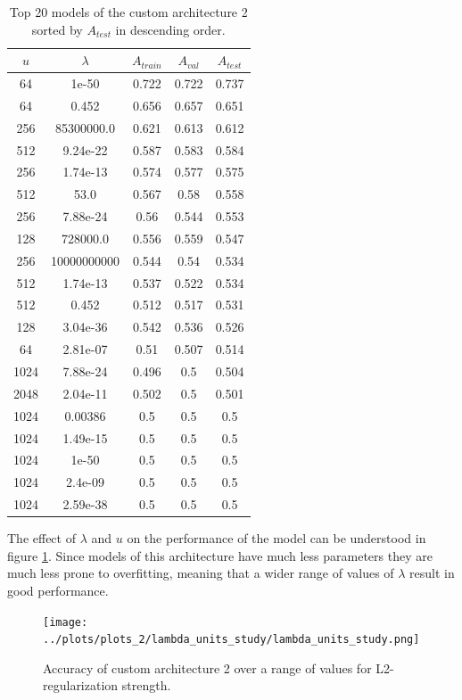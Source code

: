 \begin{table}[ht]
\centering
\begin{tabular}{ |c|c|c|c|c| }
\hline
$u$ & $\lambda$ & $A_{train}$ & $A_{val}$ & $A_{test}$ \\
\hline
64 & 1e-50 & 0.722 & 0.722 & 0.737 \\
64 & 0.452 & 0.656 & 0.657 & 0.651 \\
256 & 85300000.0 & 0.621 & 0.613 & 0.612 \\
512 & 9.24e-22 & 0.587 & 0.583 & 0.584 \\
256 & 1.74e-13 & 0.574 & 0.577 & 0.575 \\
512 & 53.0 & 0.567 & 0.58 & 0.558 \\
256 & 7.88e-24 & 0.56 & 0.544 & 0.553 \\
128 & 728000.0 & 0.556 & 0.559 & 0.547 \\
256 & 10000000000 & 0.544 & 0.54 & 0.534 \\
512 & 1.74e-13 & 0.537 & 0.522 & 0.534 \\
512 & 0.452 & 0.512 & 0.517 & 0.531 \\
128 & 3.04e-36 & 0.542 & 0.536 & 0.526 \\
64 & 2.81e-07 & 0.51 & 0.507 & 0.514 \\
1024 & 7.88e-24 & 0.496 & 0.5 & 0.504 \\
2048 & 2.04e-11 & 0.502 & 0.5 & 0.501 \\
1024 & 0.00386 & 0.5 & 0.5 & 0.5 \\
1024 & 1.49e-15 & 0.5 & 0.5 & 0.5 \\
1024 & 1e-50 & 0.5 & 0.5 & 0.5 \\
1024 & 2.4e-09 & 0.5 & 0.5 & 0.5 \\
1024 & 2.59e-38 & 0.5 & 0.5 & 0.5 \\
\hline
\end{tabular}
\caption{Top 20 models of the custom architecture 2 sorted by $A_{test}$ in descending order.}
\label{table:top20_custom2}
\end{table}


The effect of $\lambda$ and $u$ on the performance of the model can be understood in figure \ref{fig:lambda_units_study_custom2}. Since models of this architecture have much less parameters they are much less prone to overfitting, meaning that a wider range of values of $\lambda$ result in good performance.

\begin{figure}[ht]
    \centering
    \texttt{[image: ../plots/plots\_2/lambda\_units\_study/lambda\_units\_study.png]}
    \caption{Accuracy of custom architecture 2 over a range of values for L2-regularization strength.}
    \label{fig:lambda_units_study_custom2}
\end{figure}
